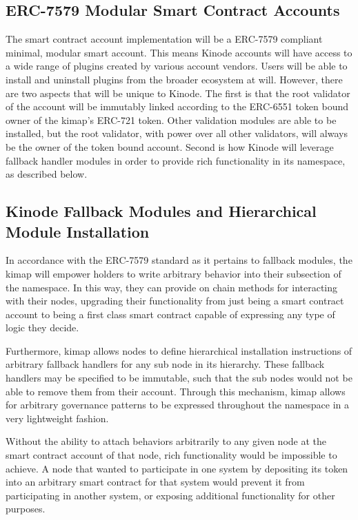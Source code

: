 \documentclass[runningheads]{llncs}
\begin{document}
\subsection{ERC-7579 Modular Smart Contract Accounts}

The smart contract account implementation will be a ERC-7579 compliant minimal, modular smart account.
This means Kinode accounts will have access to a wide range of plugins created by various account vendors.
Users will be able to install and uninstall plugins from the broader ecosystem at will.
However, there are two aspects that will be unique to Kinode. The first is that the root validator of the account
will be immutably linked according to the ERC-6551 token bound owner of the kimap's ERC-721 token.
Other validation modules are able to be installed, but the root validator, with power over all other validators, will always be the owner of the token bound account.
Second is how Kinode will leverage fallback handler modules in order to provide rich functionality in its namespace,
as described below.

\subsection{Kinode Fallback Modules and Hierarchical Module Installation}

In accordance with the ERC-7579 standard as it pertains to fallback modules, the kimap will empower holders
to write arbitrary behavior into their subsection of the namespace.
In this way, they can provide on chain methods for interacting with their nodes, upgrading their functionality
from just being a smart contract account to being a first class smart contract capable of expressing any type of
logic they decide.

Furthermore, kimap allows nodes to define hierarchical installation instructions of arbitrary fallback handlers for any sub node in its hierarchy.
These fallback handlers may be specified to be immutable, such that the sub nodes would not be able to remove them from their account.
Through this mechanism, kimap allows for arbitrary governance patterns to be expressed throughout the namespace in a very lightweight fashion.

Without the ability to attach behaviors arbitrarily to any given node at the smart contract account of that node, rich functionality would be impossible to achieve.
A node that wanted to participate in one system by depositing its token into an arbitrary smart contract for that system would prevent it from participating in another system, or exposing additional functionality for other purposes.
\end{document}
